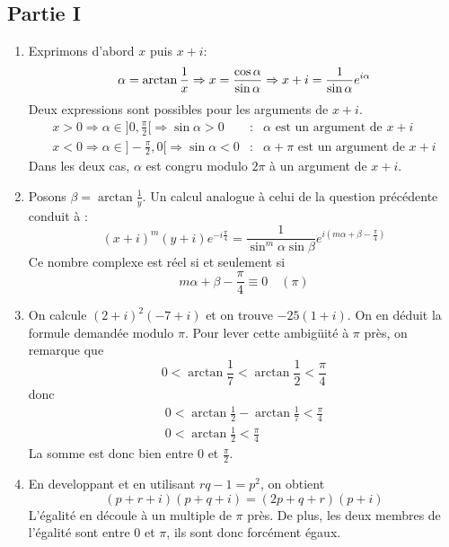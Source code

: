 \subsection*{Partie I}
\begin{enumerate}
\item Exprimons d'abord $x$ puis $x+i$:
\begin{displaymath}
 \alpha=\arctan \frac{1}{x} \Rightarrow x=\frac{\cos \alpha}{\sin \alpha}\\
\Rightarrow x+i=\frac{1}{\sin \alpha}e^{i\alpha}
\end{displaymath}
Deux expressions sont possibles pour les arguments de $x+i$.
\begin{align*}
 x>0 \Rightarrow \alpha\in ]0,\frac{\pi}{2}[ \Rightarrow \sin \alpha >0 &:& \alpha \text{ est un argument de } x+i\\
 x<0 \Rightarrow \alpha\in ]-\frac{\pi}{2},0[ \Rightarrow \sin \alpha <0 &:& \alpha +\pi \text{ est un argument de } x+i 
\end{align*}
Dans les deux cas, $\alpha$ est congru modulo $2\pi$ à un argument de $x+i$.
\item Posons $\beta = \arctan \frac{1}{y}$. Un calcul analogue à celui de la question précédente conduit à :
\[(x+i)^m(y+i)e^{-i\frac{\pi}{4}}=\frac{1}{\sin^m \alpha \sin \beta}e^{i(m\alpha +\beta -\frac{\pi}{4})}\]
Ce nombre complexe est réel si et seulement si
\[m\alpha +\beta -\frac{\pi}{4} \equiv 0 \quad (\pi)\]

\item On calcule $(2+i)^2(-7+i)$ et on trouve $-25(1+i)$. On en déduit la formule demandée modulo $\pi$. Pour lever cette ambigüité à $\pi$ près, on remarque que
\[0<\arctan\frac{1}{7}<\arctan\frac{1}{2}<\frac{\pi}{4}\]
donc
\begin{eqnarray*}
0<\arctan\frac{1}{2}-\arctan\frac{1}{7}<\frac{\pi}{4}\\
0<\arctan\frac{1}{2}<\frac{\pi}{4}
\end{eqnarray*}
La somme est donc bien entre $0$ et $\frac{\pi}{2}$.

\item En developpant et en utilisant $rq-1=p^2$, on obtient
\[(p+r+i)(p+q+i)=(2p+q+r)(p+i)\]
L'égalité en découle à un multiple de $\pi$ près. De plus, les deux membres de l'égalité sont entre $0$ et $\pi$, ils sont donc forcément égaux.
\end{enumerate}

